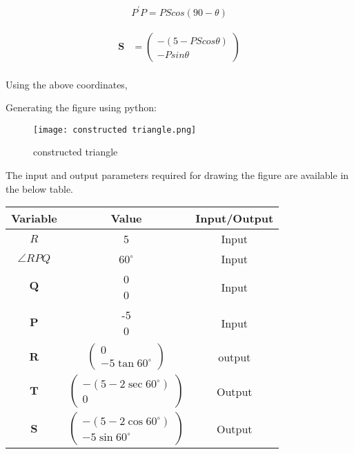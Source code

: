 \documentclass[a4paper,12pt,two column]{article}
\theoremstyle{remark}
\newcommand{\myvec}[1]{\ensuremath{\begin{pmatrix}#1\end{pmatrix}}}
\let\vec\mathbf
\begin{document}
\begin{align}
    P^\prime P = PS cos(90-\theta)
\end{align}    

\begin{align}
    \vec{S} &=\myvec{-(5 - PS cos\theta) \\ -Psin\theta}\\
\end{align}

Using the above coordinates,

Generating the figure using python:

\begin{figure}[bht]
    \centering
    \texttt{[image: constructed triangle.png]}
    \caption{constructed triangle}
    \label{fig:my_label}
\end{figure}

The input and output parameters required for drawing the figure are available in the below table.\\
\begin{table}[!h]
    \begin{tabular}{|c|c|c|} \hline
        \textbf{Variable} & \textbf{Value}    & \textbf{Input/Output}          \\ \hline
        $R$               & 5               & Input          \\ \hline
        $\angle RPQ$    &$60^\circ$   &Input       \\ \hline    
        $\vec{Q}$       &\myvec{0\\0}        & Input  \\\hline
        $\vec{P}$       &\myvec{-5\\0}& Input\\\hline
        $\vec{R}$       &  $\myvec{0\\-5\tan60^\circ}$ & output\\\hline
        $\vec{T}$       &  $\myvec{-(5-2\sec60^\circ)\\0}$ & Output\\\hline
        $\vec{S}$       &  $\myvec{-(5-2\cos60^\circ)\\-5\sin60^\circ}$ & Output\\\hline
    \end{tabular}
\end{table}
\end{document}
